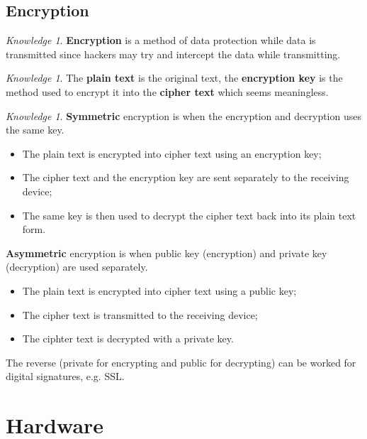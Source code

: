 \documentclass[8pt]{article}
\theoremstyle{remark}
\newtheorem{knowledge}[method]{Knowledge}
\begin{document}
        \subsection{Encryption}
            \begin{knowledge}
                \textbf{Encryption} is a method of data protection while data is transmitted since hackers may try and intercept the data while transmitting.
            \end{knowledge}

            \begin{knowledge}
                The \textbf{plain text} is the original text, the \textbf{encryption key} is the method used to encrypt it into the \textbf{cipher text} which seems meaningless.
            \end{knowledge}

            \begin{knowledge}
                \textbf{Symmetric} encryption is when the encryption and decryption uses the same key.
                \begin{itemize}
                    \item The plain text is encrypted into cipher text using an encryption key;
                    \item The cipher text and the encryption key are sent separately to the receiving device;
                    \item The same key is then used to decrypt the cipher text back into its plain text form.
                \end{itemize}

                \textbf{Asymmetric} encryption is when public key (encryption) and private key (decryption) are used separately.
                \begin{itemize}
                    \item The plain text is encrypted into cipher text using a public key;
                    \item The cipher text is transmitted to the receiving device;
                    \item The ciphter text is decrypted with a private key.
                \end{itemize}

                The reverse (private for encrypting and public for decrypting) can be worked for digital signatures, e.g. SSL.
            \end{knowledge}

    \section{Hardware}
        
\end{document}

